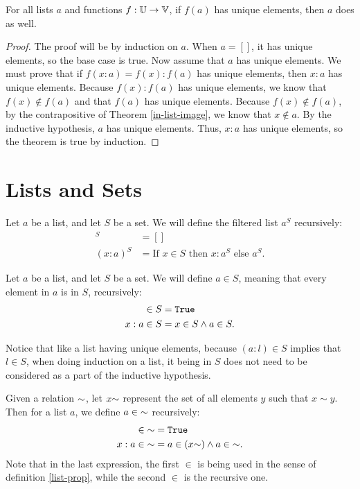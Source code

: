 \documentclass[../math.tex]{subfiles}
\begin{document}
\begin{theorem} \label{list-image-unique}
    For all lists $a$ and functions $f : \mathbb{U} \to \mathbb{V}$, if $f(a)$ has unique
    elements, then $a$ does as well.
\end{theorem}
\begin{proof}
    The proof will be by induction on $a$.  When $a = []$, it has unique
    elements, so the base case is true.  Now assume that $a$ has unique
    elements.  We must prove that if $f(x : a) = f(x) : f(a)$ has unique
    elements, then $x : a$ has unique elements.  Because $f(x) : f(a)$ has
    unique elements, we know that $f(x) \notin f(a)$ and that $f(a)$ has unique
    elements.  Because $f(x) \notin f(a)$, by the contrapositive of Theorem
    \ref{in-list-image}, we know that $x \notin a$.  By the inductive
    hypothesis, $a$ has unique elements.  Thus, $x : a$ has unique elements, so
    the theorem is true by induction.
\end{proof}

\section{Lists and Sets}

\begin{definition}
    Let $a$ be a list, and let $S$ be a set.  We will define the filtered list
    $a^S$ recursively:
    \begin{align*}
             []^S &= [] \\
        (x : a)^S &= \text{If $x \in S$ then $x : a^S$ else $a^S$}.
    \end{align*}
\end{definition}

\begin{definition} \label{list-prop}
    Let $a$ be a list, and let $S$ be a set.  We will define $a \in S$, meaning
    that every element in $a$ is in $S$, recursively:
    \begin{align*}
           [] \in S &= \vtt{True} \\
        x : a \in S &= x \in S \wedge a \in S.
    \end{align*}
\end{definition}
\noindent Notice that like a list having unique elements, because $(a : l) \in
S$ implies that $l \in S$, when doing induction on a list, it being in $S$ does
not need to be considered as a part of the inductive hypothesis.

\begin{definition}
    Given a relation ${\sim}$, let $x {\sim}$ represent the set of all elements
    $y$ such that $x \sim y$.  Then for a list $a$, we define $a \in {\sim}$
    recursively:
    \begin{align*}
           [] \in \usim &= \vtt{True} \\
        x : a \in \usim &= a \in (x \usim) \wedge a \in \usim.
    \end{align*}
    Note that in the last expression, the first $\in$ is being used in the sense
    of definition \ref{list-prop}, while the second $\in$ is the recursive one.
\end{definition}
\end{document}
